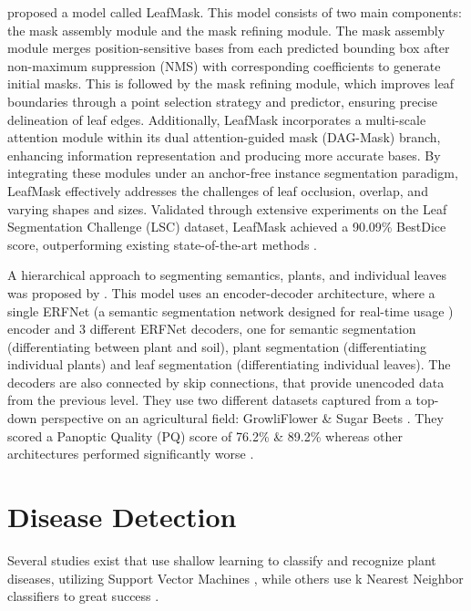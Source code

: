 \documentclass[draft,final]{vutinfth} %
\begin{document}
 \citeauthor{guo_leafmask_2021} proposed a model called LeafMask. This model consists of two main components: the mask assembly module and the mask refining module. The mask assembly module merges position-sensitive bases from each predicted bounding box after non-maximum suppression (NMS) with corresponding coefficients to generate initial masks. This is followed by the mask refining module, which improves leaf boundaries through a point selection strategy and predictor, ensuring precise delineation of leaf edges. Additionally, LeafMask incorporates a multi-scale attention module within its dual attention-guided mask (DAG-Mask) branch, enhancing information representation and producing more accurate bases. By integrating these modules under an anchor-free instance segmentation paradigm, LeafMask effectively addresses the challenges of leaf occlusion, overlap, and varying shapes and sizes. Validated through extensive experiments on the Leaf Segmentation Challenge (LSC) dataset, LeafMask achieved a 90.09\% BestDice score, outperforming existing state-of-the-art methods \cite{guo_leafmask_2021}.

A hierarchical approach to segmenting semantics, plants, and individual leaves was proposed by
\citeauthor{roggiolani_hierarchical_2023}. This model uses an encoder-decoder architecture, where a single ERFNet (a semantic segmentation network designed for real-time usage \cite{romera_erfnet_2018}) encoder and 3 different ERFNet decoders, one for semantic segmentation (differentiating between plant and soil), plant segmentation (differentiating individual plants) and leaf segmentation (differentiating individual leaves). The decoders are also connected by skip connections, that provide unencoded data from the previous level. They use two different datasets captured from a top-down perspective on an agricultural field: GrowliFlower \cite{kierdorf_growliflower_2023} \& Sugar Beets \cite{chebrolu_agricultural_2017}.
They scored a Panoptic Quality (PQ) score of 76.2\% \& 89.2\% whereas other architectures performed significantly worse \cite{roggiolani_hierarchical_2023}.  

\section{Disease Detection} \label{sec:disease_detection}
Several studies exist that use shallow learning to classify and recognize plant diseases, utilizing Support Vector Machines \cite{kirti_black_2020}, while others use k Nearest Neighbor classifiers to great success \cite{bharate_classification_2020}.
\end{document}
